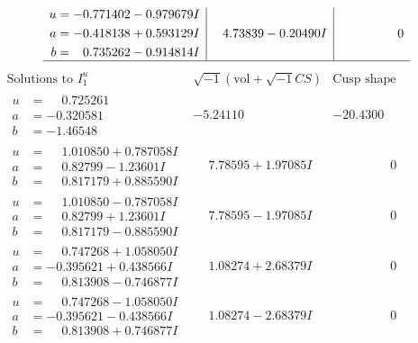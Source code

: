 \documentclass[1p]{elsarticle_modified}
\theoremstyle{definition}
\newcommand{\I}{\sqrt{-1}}
\begin{document}
$$\begin{array}{c|c|c}
\begin{aligned}
u &= -0.771402 - 0.979679 I \\
a &= -0.418138 + 0.593129 I \\
b &= \phantom{-}0.735262 - 0.914814 I\end{aligned}
 & \phantom{-}4.73839 - 0.20490 I & \phantom{-0.000000 } 0\\
 \hline 
 \end{array}$$\newpage$$\begin{array}{c|c|c}  
\text{Solutions to }I^u_{1}& \I (\text{vol} + \sqrt{-1}CS) & \text{Cusp shape}\\
 \hline 
\begin{aligned}
u &= \phantom{-}0.725261\phantom{ +0.000000I} \\
a &= -0.320581\phantom{ +0.000000I} \\
b &= -1.46548\phantom{ +0.000000I}\end{aligned}
 & -5.24110\phantom{ +0.000000I} & -20.4300\phantom{ +0.000000I} \\ \hline\begin{aligned}
u &= \phantom{-}1.010850 + 0.787058 I \\
a &= \phantom{-}0.82799 - 1.23601 I \\
b &= \phantom{-}0.817179 + 0.885590 I\end{aligned}
 & \phantom{-}7.78595 + 1.97085 I & \phantom{-0.000000 } 0 \\ \hline\begin{aligned}
u &= \phantom{-}1.010850 - 0.787058 I \\
a &= \phantom{-}0.82799 + 1.23601 I \\
b &= \phantom{-}0.817179 - 0.885590 I\end{aligned}
 & \phantom{-}7.78595 - 1.97085 I & \phantom{-0.000000 } 0 \\ \hline\begin{aligned}
u &= \phantom{-}0.747268 + 1.058050 I \\
a &= -0.395621 + 0.438566 I \\
b &= \phantom{-}0.813908 - 0.746877 I\end{aligned}
 & \phantom{-}1.08274 + 2.68379 I & \phantom{-0.000000 } 0 \\ \hline\begin{aligned}
u &= \phantom{-}0.747268 - 1.058050 I \\
a &= -0.395621 - 0.438566 I \\
b &= \phantom{-}0.813908 + 0.746877 I\end{aligned}
 & \phantom{-}1.08274 - 2.68379 I & \phantom{-0.000000 } 0 \\ \hline\begin{aligned}

\end{aligned}
\end{array}$$
\end{document}
